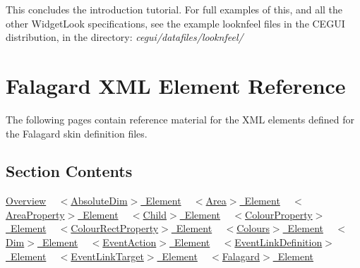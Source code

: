 This concludes the introduction tutorial. For full examples of this, and all the other Widget\+Look specifications, see the example \textquotesingle{}looknfeel\textquotesingle{} files in the C\+E\+G\+UI distribution, in the directory\+: {\itshape cegui/datafiles/looknfeel/} \hypertarget{fal_element_ref}{}\section{Falagard X\+ML Element Reference}\label{fal_element_ref}
The following pages contain reference material for the X\+ML elements defined for the Falagard skin definition files.\hypertarget{fal_element_ref_fal_elem_ref_sec_0}{}\subsection{Section Contents}\label{fal_element_ref_fal_elem_ref_sec_0}
\mbox{\hyperlink{fal_element_ref_fal_elem_ref_sec_1}{Overview}} ~\newline
 \mbox{\hyperlink{fal_element_ref_fal_elem_ref_sec_2}{$<$\+Absolute\+Dim$>$ Element}} ~\newline
 \mbox{\hyperlink{fal_element_ref_fal_elem_ref_sec_3}{$<$\+Area$>$ Element}} ~\newline
 \mbox{\hyperlink{fal_element_ref_fal_elem_ref_sec_4}{$<$\+Area\+Property$>$ Element}} ~\newline
 \mbox{\hyperlink{fal_element_ref_fal_elem_ref_sec_5}{$<$\+Child$>$ Element}} ~\newline
 \mbox{\hyperlink{fal_element_ref_fal_elem_ref_sec_6}{$<$\+Colour\+Property$>$ Element}} ~\newline
 \mbox{\hyperlink{fal_element_ref_fal_elem_ref_sec_7}{$<$\+Colour\+Rect\+Property$>$ Element}} ~\newline
 \mbox{\hyperlink{fal_element_ref_fal_elem_ref_sec_8}{$<$\+Colours$>$ Element}} ~\newline
 \mbox{\hyperlink{fal_element_ref_fal_elem_ref_sec_9}{$<$\+Dim$>$ Element}} ~\newline
 \mbox{\hyperlink{fal_element_ref_fal_elem_ref_eventaction}{$<$\+Event\+Action$>$ Element}} ~\newline
 \mbox{\hyperlink{fal_element_ref_fal_elem_ref_eventlinkdefintion}{$<$\+Event\+Link\+Definition$>$ Element}} ~\newline
 \mbox{\hyperlink{fal_element_ref_fal_elem_ref_eventlinktarget}{$<$\+Event\+Link\+Target$>$ Element}} ~\newline
 \mbox{\hyperlink{fal_element_ref_fal_elem_ref_sec_11}{$<$\+Falagard$>$ Element}} ~\newline
